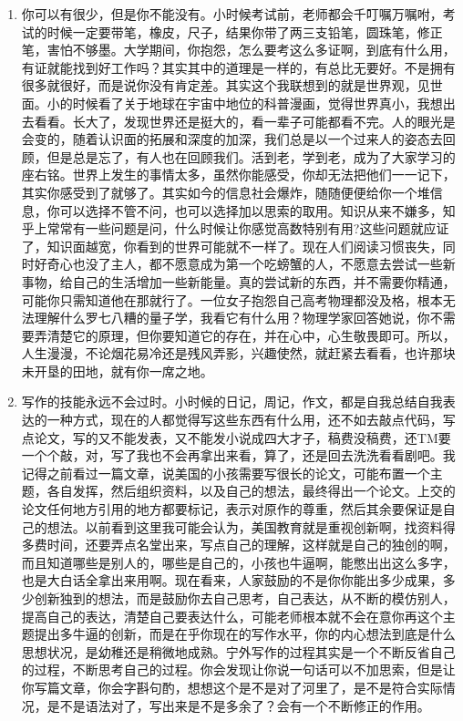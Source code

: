 \documentclass[color=green,mathpazo,titlestyle=hang]{elegantbook}
\begin{document}
\begin{enumerate}
	\item 
	{\color{main}你可以有很少，但是你不能没有。}小时候考试前，老师都会千叮嘱万嘱咐，考试的时候一定要带笔，橡皮，尺子，结果你带了两三支铅笔，圆珠笔，修正笔，害怕不够墨。大学期间，你抱怨，怎么要考这么多证啊，到底有什么用，有证就能找到好工作吗？其实其中的道理是一样的，有总比无要好。不是拥有很多就很好，而是说你没有肯定差。其实这个我联想到的就是世界观，见世面。小的时候看了关于地球在宇宙中地位的科普漫画，觉得世界真小，我想出去看看。长大了，发现世界还是挺大的，看一辈子可能都看不完。人的眼光是会变的，随着认识面的拓展和深度的加深，我们总是以一个过来人的姿态去回顾，但是总是忘了，有人也在回顾我们。活到老，学到老，成为了大家学习的座右铭。世界上发生的事情太多，虽然你能感受，你却无法把他们一一记下，其实你感受到了就够了。其实如今的信息社会爆炸，随随便便给你一个堆信息，你可以选择不管不问，也可以选择加以思索的取用。知识从来不嫌多，知乎上常常有一些问题是问，什么时候让你感觉高数特别有用?这些问题就应证了，知识面越宽，你看到的世界可能就不一样了。现在人们阅读习惯丧失，同时好奇心也没了主人，都不愿意成为第一个吃螃蟹的人，不愿意去尝试一些新事物，给自己的生活增加一些新能量。真的尝试新的东西，并不需要你精通，可能你只需知道他在那就行了。一位女子抱怨自己高考物理都没及格，根本无法理解什么罗七八糟的量子学，我看它有什么用？物理学家回答她说，你不需要弄清楚它的原理，但你要知道它的存在，并在心中，心生敬畏即可。所以，人生漫漫，不论烟花易冷还是残风弄影，兴趣使然，就赶紧去看看，也许那块未开垦的田地，就有你一席之地。
	\item 
	{\color{main}写作的技能永远不会过时。}小时候的日记，周记，作文，都是自我总结自我表达的一种方式，现在的人都觉得写这些东西有什么用，还不如去敲点代码，写点论文，写的又不能发表，又不能发小说成四大才子，稿费没稿费，还TM要一个个敲，对，写了我也不会再拿出来看，算了，还是回去洗洗看看剧吧。我记得之前看过一篇文章，说美国的小孩需要写很长的论文，可能布置一个主题，各自发挥，然后组织资料，以及自己的想法，最终得出一个论文。上交的论文任何地方引用的地方都要标记，表示对原作的尊重，然后其余要保证是自己的想法。以前看到这里我可能会认为，美国教育就是重视创新啊，找资料得多费时间，还要弄点名堂出来，写点自己的理解，这样就是自己的独创的啊，而且知道哪些是别人的，哪些是自己的，小孩也牛逼啊，能憋出出这么多字，也是大白话全拿出来用啊。现在看来，人家鼓励的不是你你能出多少成果，多少创新独到的想法，而是鼓励你去自己思考，自己表达，从不断的模仿别人，提高自己的表达，清楚自己要表达什么，可能老师根本就不会在意你再这个主题提出多牛逼的创新，而是在乎你现在的写作水平，你的内心想法到底是什么思想状况，是幼稚还是稍微地成熟。宁外写作的过程其实是一个不断反省自己的过程，不断思考自己的过程。你会发现让你说一句话可以不加思索，但是让你写篇文章，你会字斟句酌，想想这个是不是对了河里了，是不是符合实际情况，是不是语法对了，写出来是不是多余了？会有一个不断修正的作用。

\end{enumerate}
\end{document}
